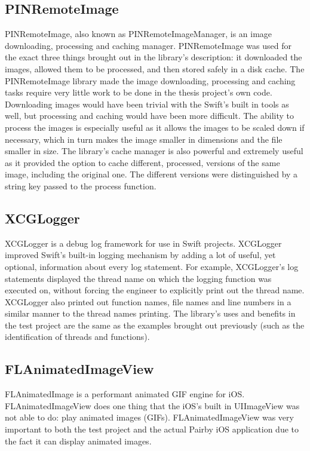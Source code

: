 \documentclass[a4paper,12pt]{article}
\begin{document}
\subsection{PINRemoteImage}
\label{subsec:pinremoteimage}
PINRemoteImage, also known as PINRemoteImageManager, is an image downloading, processing and caching manager.\cite{PINRemoteImage} PINRemoteImage was used for the exact three things brought out in the library's description: it downloaded the images, allowed them to be processed, and then stored safely in a disk cache. The PINRemoteImage library made the image downloading, processing and caching tasks require very little work to be done in the thesis project's own code. Downloading images would have been trivial with the Swift's built in tools as well, but processing and caching would have been more difficult. The ability to process the images is especially useful as it allows the images to be scaled down if necessary, which in turn makes the image smaller in dimensions and the file smaller in size. The library's cache manager is also powerful and extremely useful as it provided the option to cache different, processed, versions of the same image, including the original one. The different versions were distinguished by a string key passed to the process function.

\subsection{XCGLogger}
XCGLogger is a debug log framework for use in Swift projects.\cite{XCGLogger} XCGLogger improved Swift's built-in logging mechanism by adding a lot of useful, yet optional, information about every log statement. For example, XCGLogger's log statements displayed the thread name on which the logging function was executed on, without forcing the engineer to explicitly print out the thread name. XCGLogger also printed out function names, file names and line numbers in a similar manner to the thread names printing. The library's uses and benefits in the test project are the same as the examples brought out previously (such as the identification of threads and functions).

\subsection{FLAnimatedImageView}
\label{subsec:flanimatedimageview}
FLAnimatedImage is a performant animated GIF engine for iOS.\cite{FLAnimatedImageView} FLAnimatedImageView does one thing that the iOS's built in UIImageView was not able to do: play animated images (GIFs). FLAnimatedImageView was very important to both the test project and the actual Pairby iOS application due to the fact it can display animated images.
\end{document}

